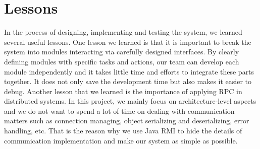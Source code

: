\documentclass[conference]{IEEEtran}
\begin{document}
\section{Lessons}
In the process of designing, implementing and testing the system, we learned several useful lessons.
One lesson we learned is that it is important to break the system into modules interacting via carefully designed interfaces. By clearly defining modules with specific tasks and actions, our team can develop each module independently and it takes little time and efforts to integrate these parts together. It does not only save the development time but also makes it easier to debug.
Another lesson that we learned is the importance of applying RPC in distributed systems. In this project, we mainly focus on architecture-level aspects and we do not want to spend a lot of time on dealing with communication matters such as connection managing, object serializing and deserializing, error handling, etc. That is the reason why we use Java RMI to hide the details of communication implementation and make our system as simple as possible.









%
%
\end{document}
